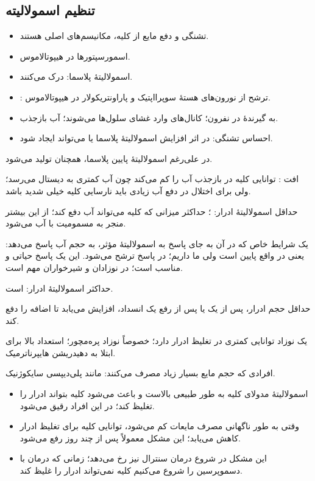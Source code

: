 \documentclass[12pt,a4paper]{article}
\begin{document}
\subsection*{تنظیم اسمولالیته}
\begin{itemize}
\item تشنگی و دفع مایع از کلیه، مکانیسم‌های اصلی هستند.
\item اسمورسپتورها در هیپوتالاموس.
\item اسمولالیتهٔ پلاسما: درک می‌کنند.
\item {}: ترشح  از نورون‌های هستهٔ سوپرااپتیک و پاراونتریکولار در هیپوتالاموس.
\item {} به گیرندهٔ  در  نفرون؛ کانال‌های  وارد غشای سلول‌ها می‌شوند؛ آب بازجذب.
\item احساس تشنگی: در اثر افزایش اسمولالیتهٔ پلاسما یا  می‌تواند ایجاد شود.
\end{itemize}
در  علی‌رغم اسمولالیتهٔ پایین پلاسما،  همچنان تولید می‌شود.

افت : توانایی کلیه در بازجذب آب را کم می‌کند چون آب کمتری به دیستال  می‌رسد؛ ولی برای اختلال در دفع آب زیادی باید نارسایی کلیه خیلی شدید باشد.

حداقل اسمولالیتهٔ ادرار: ؛ حداکثر میزانی که کلیه می‌تواند آب دفع کند؛ از این بیشتر منجر به مسمومیت با آب می‌شود.

یک شرایط خاص که در آن  به جای پاسخ به اسمولالیتهٔ مؤثر، به حجم آب پاسخ می‌دهد: یعنی در واقع  پایین است ولی ما  داریم؛ در پاسخ  ترشح می‌شود. این یک پاسخ حیاتی و مناسب است؛ در نوزادان و شیرخواران مهم است.

حداکثر اسمولالیتهٔ ادرار:  است.

حداقل حجم ادرار، پس از یک  یا پس از رفع یک انسداد، افزایش می‌یابد تا  اضافه را دفع کند.

یک نوزاد توانایی کمتری در تغلیظ ادرار دارد؛ خصوصاً نوزاد پره‌مچور؛ استعداد بالا برای ابتلا به دهیدریشن هایپرناترمیک.

افرادی که حجم مایع بسیار زیاد مصرف می‌کنند: مانند پلی‌دیپسی سایکوژنیک.
\begin{itemize}
\item اسمولالیتهٔ مدولای کلیه به طور طبیعی بالاست و باعث می‌شود کلیه بتواند ادرار را تغلیظ کند؛ در این افراد رقیق می‌شود.
\item وقتی به طور ناگهانی مصرف مایعات کم می‌شود، توانایی کلیه برای تغلیظ ادرار کاهش می‌یابد؛ این مشکل معمولاً پس از چند روز رفع می‌شود.
\item این مشکل در شروع درمان  سنترال نیز رخ می‌دهد؛ زمانی که درمان با دسموپرسین را شروع می‌کنیم کلیه نمی‌تواند ادرار را غلیظ کند.
\end{itemize}
\end{document}
